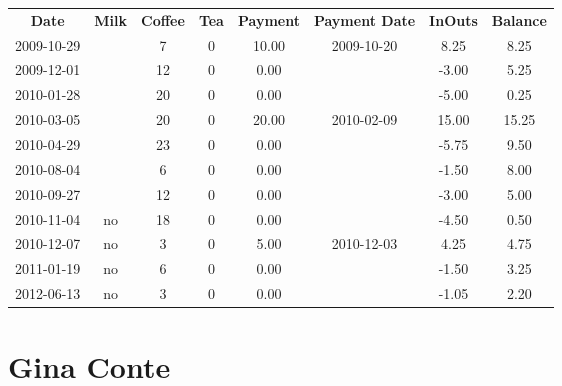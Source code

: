 \begin{center}
\begin{tabular}{cccccccc}
\textbf{Date} & \textbf{Milk} & \textbf{Coffee} & \textbf{Tea} & \textbf{Payment} & \textbf{Payment Date} & \textbf{InOuts} & \textbf{Balance} \\
2009-10-29 &  &  7 & 0 & 10.00 & 2009-10-20 &  8.25 &  8.25\\ 
2009-12-01 &  & 12 & 0 &  0.00 &  & -3.00 &  5.25\\ 
2010-01-28 &  & 20 & 0 &  0.00 &  & -5.00 &  0.25\\ 
2010-03-05 &  & 20 & 0 & 20.00 & 2010-02-09 & 15.00 & 15.25\\ 
2010-04-29 &  & 23 & 0 &  0.00 &  & -5.75 &  9.50\\ 
2010-08-04 &  &  6 & 0 &  0.00 &  & -1.50 &  8.00\\ 
2010-09-27 &  & 12 & 0 &  0.00 &  & -3.00 &  5.00\\ 
2010-11-04 & no & 18 & 0 &  0.00 &  & -4.50 &  0.50\\ 
2010-12-07 & no &  3 & 0 &  5.00 & 2010-12-03 &  4.25 &  4.75\\ 
2011-01-19 & no &  6 & 0 &  0.00 &  & -1.50 &  3.25\\ 
2012-06-13 & no &  3 & 0 &  0.00 &  & -1.05 &  2.20
\end{tabular}
\end{center}

\section{Gina Conte}

